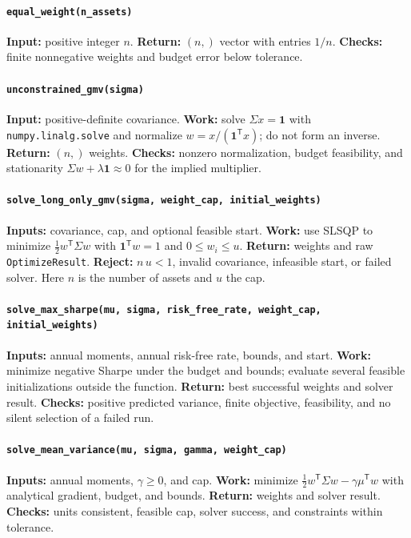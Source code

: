 \documentclass[10pt]{article}
\newcommand{\trans}{^{\mathsf T}}
\begin{document}
\begin{sloppypar}
\paragraph{\texttt{equal\_weight(n\_assets)}}
\textbf{Input:} positive integer $n$.
\textbf{Return:} $(n,)$ vector with entries $1/n$.
\textbf{Checks:} finite nonnegative weights and budget error below tolerance.

\paragraph{\texttt{unconstrained\_gmv(sigma)}}
\textbf{Input:} positive-definite covariance.
\textbf{Work:} solve $\Sigma x=\mathbf1$ with
\texttt{numpy.linalg.solve} and normalize $w=x/(\mathbf1\trans x)$; do not form
an inverse. \textbf{Return:} $(n,)$ weights.
\textbf{Checks:} nonzero normalization, budget feasibility, and stationarity
$\Sigma w+\lambda\mathbf1\approx0$ for the implied multiplier.

\paragraph{\texttt{solve\_long\_only\_gmv(sigma, weight\_cap,
initial\_weights)}}
\textbf{Inputs:} covariance, cap, and optional feasible start.
\textbf{Work:} use SLSQP to minimize $\frac12w\trans\Sigma w$ with
$\mathbf1\trans w=1$ and $0\leq w_i\leq u$.
\textbf{Return:} weights and raw \texttt{OptimizeResult}.
\textbf{Reject:} $n\,u<1$, invalid covariance, infeasible start, or failed solver.
Here $n$ is the number of assets and $u$ the cap.

\paragraph{\texttt{solve\_max\_sharpe(mu, sigma, risk\_free\_rate,
weight\_cap, initial\_weights)}}
\textbf{Inputs:} annual moments, annual risk-free rate, bounds, and start.
\textbf{Work:} minimize negative Sharpe under the budget and bounds; evaluate
several feasible initializations outside the function.
\textbf{Return:} best successful weights and solver result.
\textbf{Checks:} positive predicted variance, finite objective, feasibility,
and no silent selection of a failed run.

\paragraph{\texttt{solve\_mean\_variance(mu, sigma, gamma, weight\_cap)}}
\textbf{Inputs:} annual moments, $\gamma\geq0$, and cap.
\textbf{Work:} minimize
$\frac12w\trans\Sigma w-\gamma\mu\trans w$ with analytical gradient, budget,
and bounds. \textbf{Return:} weights and solver result.
\textbf{Checks:} units consistent, feasible cap, solver success, and
constraints within tolerance.


\end{sloppypar}
\end{document}
